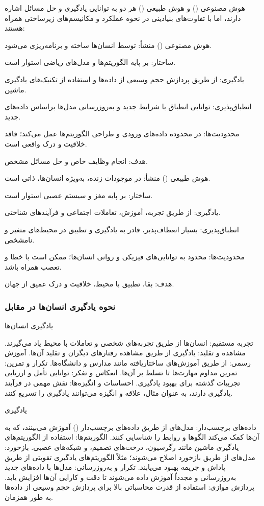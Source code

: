 \documentclass[a4paper, titlepage]{article}
\begin{document}
هوش مصنوعی () و هوش طبیعی () هر دو به توانایی یادگیری و حل مسائل اشاره دارند، اما با تفاوت‌های بنیادینی در نحوه عملکرد و مکانیسم‌های زیرساختی همراه هستند:

هوش مصنوعی ()
منشأ: توسط انسان‌ها ساخته و برنامه‌ریزی می‌شود.

ساختار: بر پایه الگوریتم‌ها و مدل‌های ریاضی استوار است.

یادگیری: از طریق پردازش حجم وسیعی از داده‌ها و استفاده از تکنیک‌های یادگیری ماشین.

انطباق‌پذیری: توانایی انطباق با شرایط جدید و به‌روز‌رسانی مدل‌ها براساس داده‌های جدید.

محدودیت‌ها: در محدوده داده‌های ورودی و طراحی الگوریتم‌ها عمل می‌کند؛ فاقد خلاقیت و درک واقعی است.

هدف: انجام وظایف خاص و حل مسائل مشخص.

هوش طبیعی ()
منشأ: در موجودات زنده، به‌ویژه انسان‌ها، ذاتی است.

ساختار: بر پایه مغز و سیستم عصبی استوار است.

یادگیری: از طریق تجربه، آموزش، تعاملات اجتماعی و فرآیندهای شناختی.

انطباق‌پذیری: بسیار انعطاف‌پذیر، قادر به یادگیری و تطبیق در محیط‌های متغیر و نامشخص.

محدودیت‌ها: محدود به توانایی‌های فیزیکی و روانی انسان‌ها؛ ممکن است با خطا و تعصب همراه باشد.

هدف: بقا، تطبیق با محیط، خلاقیت و درک عمیق از جهان.

\subsubsection{نحوه یادگیری انسان‌ها در مقابل }


یادگیری انسان‌ها

تجربه مستقیم: انسان‌ها از طریق تجربه‌های شخصی و تعاملات با محیط یاد می‌گیرند.
مشاهده و تقلید: یادگیری از طریق مشاهده رفتارهای دیگران و تقلید آن‌ها.
آموزش رسمی: از طریق آموزش‌های ساختاریافته مانند مدارس و دانشگاه‌ها.
تکرار و تمرین: تمرین مداوم مهارت‌ها تا تسلط بر آن‌ها.
انعکاس و تفکر: توانایی تأمل و ارزیابی تجربیات گذشته برای بهبود یادگیری.
احساسات و انگیزه‌ها: نقش مهمی در فرآیند یادگیری دارند، به عنوان مثال، علاقه و انگیزه می‌توانند یادگیری را تسریع کنند.


یادگیری

داده‌های برچسب‌دار: مدل‌های  از طریق داده‌های برچسب‌دار () آموزش می‌بینند، که به آن‌ها کمک می‌کند الگوها و روابط را شناسایی کنند.
الگوریتم‌ها: استفاده از الگوریتم‌های یادگیری ماشین مانند رگرسیون، درخت‌های تصمیم، و شبکه‌های عصبی.
بازخورد: مدل‌های  از طریق بازخورد اصلاح می‌شوند؛ مثلاً الگوریتم‌های یادگیری تقویتی از طریق پاداش و جریمه بهبود می‌یابند.
تکرار و به‌روزرسانی: مدل‌ها با داده‌های جدید به‌روزرسانی و مجدداً آموزش داده می‌شوند تا دقت و کارایی آن‌ها افزایش یابد.
پردازش موازی: استفاده از قدرت محاسباتی بالا برای پردازش حجم وسیعی از داده‌ها به طور همزمان.
\end{document}
